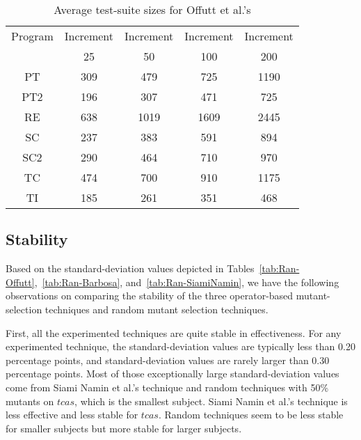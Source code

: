 \begin{table}[t]
\caption{\label{tab:TestSuiteSize} Average test-suite sizes for
Offutt et al.'s} \centering \hspace*{-0.3cm}
\begin{tabular}{|c|c|c|c|c|}
  \hline
  Program & Increment  &Increment  & Increment &Increment \\
  ~ & 25  &50  & 100 &200 \\
   \hline
  \hline
  PT&309 &479 &725 &1190\\
  \hline
  PT2&196 &307 &471 &725\\
  \hline
  RE&638 &1019 &1609 &2445\\
  \hline
  SC&237 &383 &591 &894\\
  \hline
  SC2&290 &464 &710 &970\\
  \hline
  TC&474 &700 &910 &1175\\
  \hline
  TI&185 &261 &351 &468\\
  \hline
\end{tabular}
\vspace{-4ex}
\end{table}

\vspace{-1.5ex}
\subsection{Stability}
\label{Stability}

Based on the standard-deviation values depicted in
Tables~\ref{tab:Ran-Offutt},~\ref{tab:Ran-Barbosa},
and~\ref{tab:Ran-SiamiNamin}, we have the following observations
on comparing the stability of the three
operator-based mutant-selection techniques and random mutant
selection techniques.

First, all the experimented techniques are quite stable in
effectiveness. For any experimented technique, the
standard-deviation values are typically less than 0.20 percentage
points, and standard-deviation values are rarely
larger than 0.30 percentage points. Most of those exceptionally
large standard-deviation values come from Siami Namin et al.'s
technique and random techniques with 50\% mutants on $tcas$, which
is the smallest subject. Siami Namin et al.'s technique is less
effective and less stable for $tcas$. Random techniques seem to be
less stable for smaller subjects but more stable for larger
subjects.

